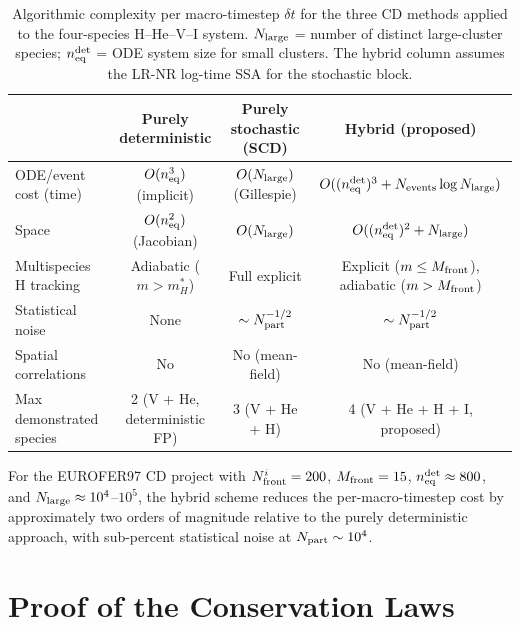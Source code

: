 \documentclass[pdflatex,sn-basic]{sn-jnl} %
\begin{document}
\begin{table}[htbp]
\centering
\caption{Algorithmic complexity per macro-timestep $\delta t$ for the
three CD methods applied to the four-species H--He--V--I system.
$N_{\rm large}$ = number of distinct large-cluster species;
$n_{\rm eq}^{\rm det}$ = ODE system size for small clusters.
The hybrid column assumes the LR-NR log-time SSA for the stochastic
block.}
\label{tab:hybrid_complexity}
\renewcommand{\arraystretch}{1.3}
\begin{tabular}{@{}lccc@{}}
\toprule
& \textbf{Purely deterministic} & \textbf{Purely stochastic (SCD)}
  & \textbf{Hybrid (proposed)} \\
\midrule
ODE/event cost (time) &
  $O(n_{\rm eq}^3)$ (implicit) &
  $O(N_{\rm large})$ (Gillespie) &
  $O((n_{\rm eq}^{\rm det})^3 + N_{\rm events}\log N_{\rm large})$ \\
Space &
  $O(n_{\rm eq}^2)$ (Jacobian) &
  $O(N_{\rm large})$ &
  $O((n_{\rm eq}^{\rm det})^2 + N_{\rm large})$ \\
Multispecies H tracking &
  Adiabatic ($m > m_H^*$) &
  Full explicit &
  Explicit ($m \leq M_{\rm front}$),
  adiabatic ($m > M_{\rm front}$) \\
Statistical noise &
  None &
  $\sim N_{\rm part}^{-1/2}$ &
  $\sim N_{\rm part}^{-1/2}$ \\
Spatial correlations &
  No &
  No (mean-field) &
  No (mean-field) \\
Max demonstrated species &
  2 (V + He, deterministic FP) &
  3 (V + He + H) &
  4 (V + He + H + I, proposed) \\
\bottomrule
\end{tabular}
\end{table}

For the EUROFER97 CD project with $N_{\rm front}^i = 200$,
$M_{\rm front} = 15$, $n_{\rm eq}^{\rm det} \approx 800$,
and $N_{\rm large} \approx 10^4$--$10^5$, the hybrid scheme
reduces the per-macro-timestep cost by approximately two orders
of magnitude relative to the purely deterministic approach, with
sub-percent statistical noise at $N_{\rm part} \sim 10^4$.





\newpage
\appendix
\section{Proof of the Conservation Laws}
\label{app:conservation}
\end{document}
